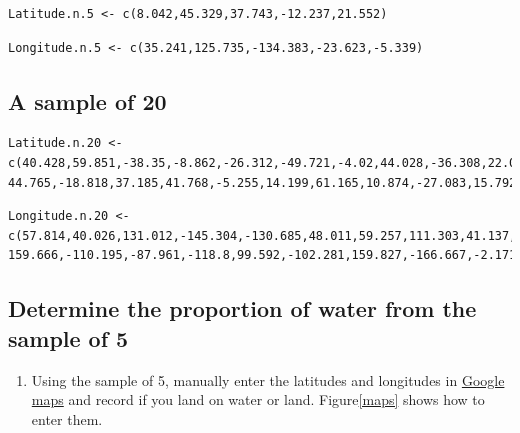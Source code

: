 \documentclass[letterpaper,10pt,twoside,]{pinp}
\providecommand{\tightlist}{%
  \setlength{\itemsep}{0pt}\setlength{\parskip}{0pt}}
\begin{document}
\begin{ShadedResult}
\begin{verbatim}
Latitude.n.5 <- c(8.042,45.329,37.743,-12.237,21.552)
\end{verbatim}
\end{ShadedResult}
\begin{ShadedResult}
\begin{verbatim}
Longitude.n.5 <- c(35.241,125.735,-134.383,-23.623,-5.339)
\end{verbatim}
\end{ShadedResult}

\hypertarget{a-sample-of-20}{%
\subsection*{A sample of 20}\label{a-sample-of-20}}

\begin{ShadedResult}
\begin{verbatim}
Latitude.n.20 <- c(40.428,59.851,-38.35,-8.862,-26.312,-49.721,-4.02,44.028,-36.308,22.071,
44.765,-18.818,37.185,41.768,-5.255,14.199,61.165,10.874,-27.083,15.792)
\end{verbatim}
\end{ShadedResult}
\begin{ShadedResult}
\begin{verbatim}
Longitude.n.20 <- c(57.814,40.026,131.012,-145.304,-130.685,48.011,59.257,111.303,41.137,-61.05,
159.666,-110.195,-87.961,-118.8,99.592,-102.281,159.827,-166.667,-2.171,-6.664)
\end{verbatim}
\end{ShadedResult}

\hypertarget{determine-the-proportion-of-water-from-the-sample-of-5}{%
\subsection{Determine the proportion of water from the sample of
5}\label{determine-the-proportion-of-water-from-the-sample-of-5}}

\begin{enumerate}
\def\labelenumi{\arabic{enumi}.}
\tightlist
\item
  Using the sample of 5, manually enter the latitudes and longitudes in
  \href{https://www.google.com/maps}{Google maps} and record if you land
  on water or land. Figure\ref{maps} shows how to enter them.
\end{enumerate}
\end{document}
